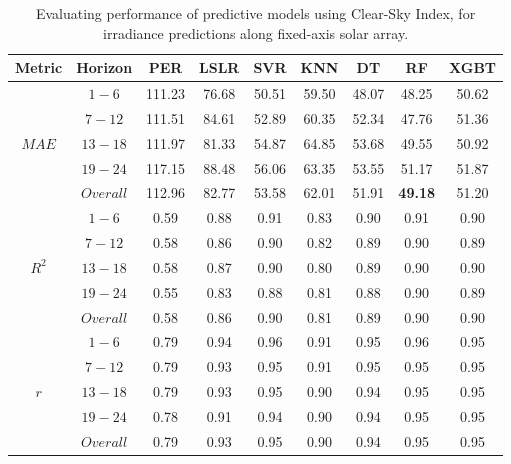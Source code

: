 \begin{table}[h]
\begin{center}
    \caption{Evaluating performance of predictive models using Clear-Sky Index, for irradiance predictions along fixed-axis solar array.}
    \vspace{0.2cm}
    \label{Tab:mmb_array_b}
    \begin{tabular}{ccccccccc}
    \toprule
    \textbf{Metric} & \textbf{Horizon} & \textbf{PER} & \textbf{LSLR} & \textbf{SVR} & \textbf{KNN} & \textbf{DT} & \textbf{RF} & \textbf{XGBT} \\ 
    \midrule
    \multirow{5}{*}{$MAE$} & $1 - 6$ & 111.23 & 76.68 & 50.51 & 59.50  & 48.07 & 48.25 & 50.62 \\
                             & $7 - 12$ & 111.51 & 84.61 & 52.89 & 60.35 & 52.34 & 47.76 & 51.36 \\
                             & $13 - 18$ & 111.97 & 81.33 & 54.87 & 64.85 & 53.68 & 49.55 & 50.92 \\
                             & $19 - 24$ & 117.15 & 88.48 & 56.06 & 63.35 & 53.55 & 51.17 & 51.87 \\
                             & $Overall$ & 112.96 & 82.77 & 53.58 & 62.01 & 51.91 & \textbf{49.18} & 51.20 \\
    \midrule
    \multirow{5}{*}{$R^2$} & $1 - 6$ & 0.59 & 0.88  & 0.91  & 0.83  & 0.90 & 0.91 & 0.90 \\
                             & $7 - 12$ & 0.58 & 0.86  & 0.90   & 0.82  & 0.89  & 0.90 & 0.89 \\
                             & $13 - 18$ & 0.58 & 0.87  & 0.90   & 0.80   & 0.89  & 0.90 & 0.90 \\
                             & $19 - 24$ & 0.55 & 0.83  & 0.88  & 0.81  & 0.88  & 0.90 & 0.89 \\
                             & $Overall$ & 0.58 & 0.86  & 0.90   & 0.81  & 0.89  & 0.90 & 0.90 \\ 
    \midrule
    \multirow{5}{*}{$r$}    & $1 - 6$ & 0.79 & 0.94  & 0.96  & 0.91 & 0.95  & 0.96 & 0.95  \\
                            & $7 - 12$ & 0.79 & 0.93  & 0.95  & 0.91 & 0.95  & 0.95 & 0.95  \\
                            & $13 - 18$ & 0.79 & 0.93  & 0.95  & 0.90 & 0.94  & 0.95 & 0.95  \\
                            & $19 - 24$ & 0.78 & 0.91  & 0.94  & 0.90 & 0.94  & 0.95 & 0.95  \\
                            & $Overall$ & 0.79 & 0.93  & 0.95  & 0.90 & 0.94  & 0.95 & 0.95  \\
    \bottomrule
    \end{tabular}
\end{center}
\end{table}

